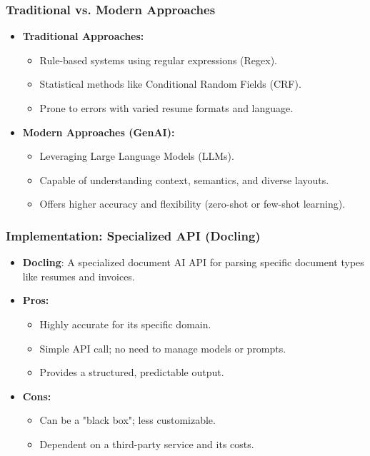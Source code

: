 \begin{frame}[fragile]\frametitle{Traditional vs. Modern Approaches}
    \begin{itemize}
        \item \textbf{Traditional Approaches:}
        \begin{itemize}
            \item Rule-based systems using regular expressions (Regex).
            \item Statistical methods like Conditional Random Fields (CRF).
            \item Prone to errors with varied resume formats and language.
        \end{itemize}
        \item \textbf{Modern Approaches (GenAI):}
        \begin{itemize}
            \item Leveraging Large Language Models (LLMs).
            \item Capable of understanding context, semantics, and diverse layouts.
            \item Offers higher accuracy and flexibility (zero-shot or few-shot learning).
        \end{itemize}
    \end{itemize}
\end{frame}

\begin{frame}[fragile]\frametitle{Implementation: Specialized API (Docling)}
    \begin{itemize}
        \item \textbf{Docling}: A specialized document AI API for parsing specific document types like resumes and invoices.
        \item \textbf{Pros:}
        \begin{itemize}
            \item Highly accurate for its specific domain.
            \item Simple API call; no need to manage models or prompts.
            \item Provides a structured, predictable output.
        \end{itemize}
        \item \textbf{Cons:}
        \begin{itemize}
            \item Can be a "black box"; less customizable.
            \item Dependent on a third-party service and its costs.
        \end{itemize}
    \end{itemize}
\end{frame}

